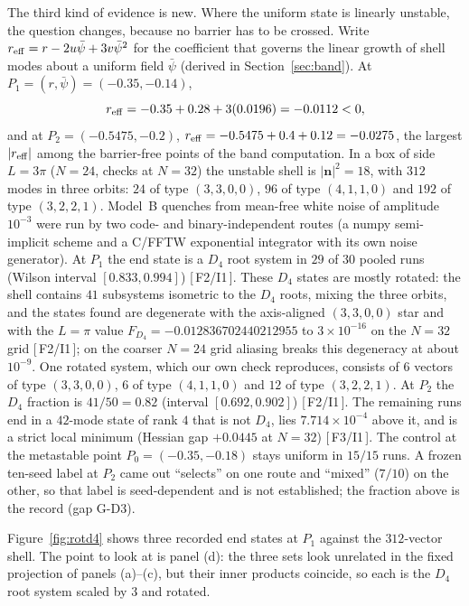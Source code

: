 \documentclass[a4paper,11pt]{article}
\numberwithin{equation}{section}
\theoremstyle{jsplain}
\theoremstyle{jsrem}
\newcommand{\grade}[1]{[\,#1\,]}
\begin{document}
The third kind of evidence is new. Where the uniform state is linearly unstable, the question changes, because no barrier has to be crossed. Write $r_{\rm eff}=r-2u\bar\psi+3v\bar\psi^2$ for the coefficient that governs the linear growth of shell modes about a uniform field $\bar\psi$ (derived in Section~\ref{sec:band}). At $P_1=(r,\bar\psi)=(-0.35,-0.14)$,
\[
r_{\rm eff}=-0.35+0.28+3(0.0196)=-0.0112<0,
\]
and at $P_2=(-0.5475,-0.2)$, $r_{\rm eff}=-0.5475+0.4+0.12=-0.0275$, the largest $|r_{\rm eff}|$ among the barrier-free points of the band computation. In a box of side $L=3\pi$ ($N=24$, checks at $N=32$) the unstable shell is $|\mathbf{n}|^2=18$, with $312$ modes in three orbits: $24$ of type $(3,3,0,0)$, $96$ of type $(4,1,1,0)$ and $192$ of type $(3,2,2,1)$. Model~B quenches from mean-free white noise of amplitude $10^{-3}$ were run by two code- and binary-independent routes (a numpy semi-implicit scheme and a C/FFTW exponential integrator with its own noise generator). At $P_1$ the end state is a $D_4$ root system in $29$ of $30$ pooled runs (Wilson interval $[0.833,0.994]$) \grade{F2/I1}. These $D_4$ states are mostly rotated: the shell contains $41$ subsystems isometric to the $D_4$ roots, mixing the three orbits, and the states found are degenerate with the axis-aligned $(3,3,0,0)$ star and with the $L=\pi$ value $F_{D_4}=-0.012836702440212955$ to $3\times10^{-16}$ on the $N=32$ grid \grade{F2/I1}; on the coarser $N=24$ grid aliasing breaks this degeneracy at about $10^{-9}$. One rotated system, which our own check reproduces, consists of $6$ vectors of type $(3,3,0,0)$, $6$ of type $(4,1,1,0)$ and $12$ of type $(3,2,2,1)$. At $P_2$ the $D_4$ fraction is $41/50=0.82$ (interval $[0.692,0.902]$) \grade{F2/I1}. The remaining runs end in a $42$-mode state of rank $4$ that is not $D_4$, lies $7.714\times10^{-4}$ above it, and is a strict local minimum (Hessian gap $+0.0445$ at $N=32$) \grade{F3/I1}. The control at the metastable point $P_0=(-0.35,-0.18)$ stays uniform in $15/15$ runs. A frozen ten-seed label at $P_2$ came out ``selects'' on one route and ``mixed'' ($7/10$) on the other, so that label is seed-dependent and is not established; the fraction above is the record (gap G-D3).

Figure~\ref{fig:rotd4} shows three recorded end states at $P_1$ against the $312$-vector shell. The point to look at is panel (d): the three sets look unrelated in the fixed projection of panels (a)--(c), but their inner products coincide, so each is the $D_4$ root system scaled by $3$ and rotated.
\end{document}
